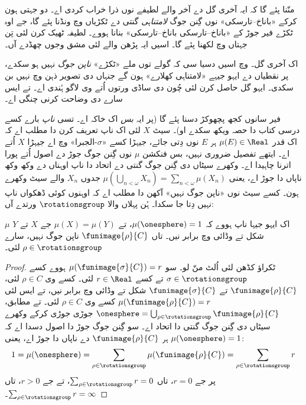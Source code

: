 \documentclass[../../../include/open-logic-section]{subfiles}
\begin{document}
منّنا پئے گا کہ ایہ آخری گل  دے آخر والے لطیفے نوں ذرا خراب کردی اے۔ دو جہتی ہون کرکے «باناخ–تارسکی» نوں گِنن جوگ \emph{لامتناہی} گنتی دے ٹکڑیاں وچ ونڈنا پئے گا، جے اوہ ٹکڑے فیر جوڑ کے «باناخ–تارسکی باناخ–تارسکی» بنانا ہووے۔ لطیفہ ٹھیک کرن لئی تِن جہتاں وچ لکھنا پئے گا۔ اسیں ایہ پڑھن والے لئی مشق وجوں چھڈدے آں۔

اک آخری گل۔  وچ اسیں دسیا سی کہ گولے توں ملے «ٹکڑے» \emph{ناپن جوگ} نہیں ہو سکدے، پر نقطیاں دے ایہو جیہے «لامتناہی کھلارے» ہون گے جنہاں دی تصویر ذہن وچ نہیں بن سکدی۔ ایہو گل  حاصل کرن لئی چُون دی ساڈی ورتوں اُتے وی لاگو ہُندی اے۔ تے ایس سارے دی وضاحت کرنی چنگی اے۔

فیر سانوں کجھ پچھوکڑ دسنا پئے گا (پر ایہ \emph{بس} اک خاکہ اے۔ تسی \emph{ناپ} بارے کسے درسی کتاب دا حصہ ویکھ سکدے او)۔ سیٹ $X$ لئی اک ناپ تعریف کرن دا مطلب اے کہ اک قدر $\mu(E) \in
\Real$ ہر $E$ نوں دِتی جائے، جیہڑا کسے «$\sigma$-الجبرا» وچ اے جیہڑا $X$ اُتے اے۔ ایتھے تفصیل ضروری نہیں، بس فنکشن $\mu$ نوں گِنن جوگ جوڑ دے اصول اُتے پورا اترنا چاہیدا اے۔ وکھرے سیٹاں دی گِنن جوگ گنتی دے اتحاد دا ناپ اوہناں دے وکھ وکھ ناپاں دا جوڑ اے، یعنی
$\mu(\bigcup_{n < \omega} X_n) = \sum_{n < \omega}\mu(X_n)$ جدوں $X_n$ والے سیٹ وکھرے ہون۔ کسے سیٹ نوں «ناپن جوگ نہیں» آکھن دا مطلب اے کہ اوہنوں کوئی ڈھکواں ناپ نہیں دِتا جا سکدا۔ ہُن پہلاں والا $\rotationsgroup$ ورتدے آں:

\begin{cor}[ویتالی]
$\mu$ اک ایہو جیہا ناپ ہووے کہ $\mu(\onesphere) = 1$، تے $\mu(X) = \mu(Y)$ جے $X$ تے $Y$ شکل تے وڈائی وچ برابر نیں۔ تاں
$\funimage{\rho}{C}$ ناپن جوگ نہیں، سارے $\rho \in
\rotationsgroup$ لئی۔
\end{cor}

\begin{proof}
ٹکراؤ کڈھن لئی اُلٹ منّ لو۔ سو $\mu(\funimage{\sigma}{C}) =
r$ ہووے کسے $\sigma \in \rotationsgroup$ تے کسے $r \in \Real$ لئی۔ کسے وی $\rho \in C$ لئی، $\funimage{\rho}{C}$ تے $\funimage{\sigma}{C}$ شکل تے وڈائی وچ برابر نیں، تے ایس لئی $\mu(\funimage{\rho}{C}) = r$ کسے وی $\rho \in
C$ لئی۔  تے  مطابق، $\onesphere =
\bigcup_{\rho \in \rotationsgroup}\funimage{\rho}{C}$ جوڑی جوڑی کرکے وکھرے سیٹاں دی گِنن جوگ گنتی دا اتحاد اے۔ سو گِنن جوگ جوڑ دا اصول دسدا اے کہ $\mu(\onesphere) = 1$ ہر $\funimage{\rho}{C}$ دے ناپاں دا جوڑ اے، یعنی:
\[
	1 = \mu(\onesphere) = \sum_{\rho \in \rotationsgroup}\mu(\funimage{\rho}{C}) = \sum_{\rho \in \rotationsgroup}r
\]
پر جے $r = 0$، تاں $\sum_{\rho \in \rotationsgroup}r = 0$، تے جے $r
> 0$، تاں $\sum_{\rho \in \rotationsgroup}r = \infty$۔
\end{proof}
\end{document}
